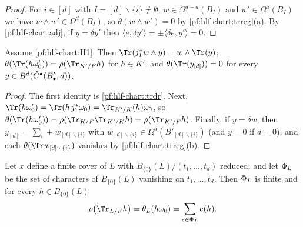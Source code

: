 \begin{proof}
For $i\in[d]$ with $I=[d]\smallsetminus\{i\}\ne\emptyset$, $w\in\Omega^{d-a}(B_I)$ and $w'\in\Omega^a(B_I)$ we have $w\wedge w'\in\Omega^d(B_I)$,
so $\theta(w\wedge w')=0$ by \cref{pf:hlf-chart:trreg}(a). By \cref{pf:hlf-chart:adj}, if $y=\delta y'$ then
$\langle e,\delta y'\rangle=\pm\langle\delta e,y'\rangle=0$.
\end{proof}

\begin{lemma}\label{pf:hlf-chart:trtop}
Assume \ref{pf:hlf-chart:H1}. Then $\Tr(j_1^*w\wedge y)=w\wedge\Tr(y)$; $\theta(\Tr(h\omega'_0))=\rho(\Tr_{K'/F}h)$ for $h\in K'$; and
$\theta(\Tr(y_{[d]}))=0$ for every $y\in B^d(\check{C}^\bullet(B'_\bullet,d))$.
\end{lemma}

\begin{proof}
The first identity is \cref{pf:hlf-chart:trdr}. Next, $\Tr(h\omega'_0)=\Tr(h\,j_1^*\omega_0)=\Tr_{K'/K}(h)\omega_0$, so
$\theta(\Tr(h\omega'_0))=\rho(\Tr_{K/F}\Tr_{K'/K}h)=\rho(\Tr_{K'/F}h)$. Finally, if $y=\delta w$, then
$y_{[d]}=\sum_i\pm w_{[d]\smallsetminus\{i\}}$ with $w_{[d]\smallsetminus\{i\}}\in\Omega^d(B'_{[d]\smallsetminus\{i\}})$ (and $y=0$ if $d=0$), and each
$\theta(\Tr w_{[d]\smallsetminus\{i\}})$ vanishes by \cref{pf:hlf-chart:trreg}(b).
\end{proof}

\begin{lemma}\label{pf:hlf-chart:rt1}
Let $x$ define a finite cover of $L$ with $B_{\{0\}}(L)/(t_1,\dots,t_d)$ reduced, and let $\Phi_L$ be the set of characters of $B_{\{0\}}(L)$
vanishing on $t_1,\dots,t_d$. Then $\Phi_L$ is finite and for every $h\in B_{\{0\}}(L)$
\[
  \rho\bigl(\Tr_{L/F}h\bigr)=\theta_L(h\omega_0)=\sum_{e\in\hlfcfib_L}e(h).
\]
\end{lemma}

